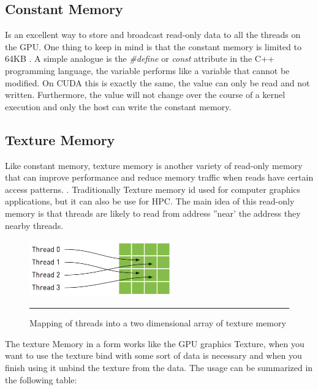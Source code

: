    
\subsection{Constant Memory}

Is an excellent way to store and broadcast read-only data to all the threads on the GPU. One thing to keep in mind is that the constant memory is limited to 64KB \cite{design}. A simple analogue is the \textit{\#define} or \textit{const} attribute in the C++ programming language, the variable performs like a variable that cannot be modified. On CUDA this is exactly the same, the value can only be read and not written. Furthermore, the value will not change over the course of a kernel execution and only the host can write the constant memory\cite{example}.

\subsection{Texture Memory}

Like constant memory, texture memory is another variety of read-only memory that can improve performance and reduce memory traffic when reads have certain access patterns. . Traditionally Texture memory id used for computer graphics applications, but it can also be use for HPC. The main idea of this read-only memory is that threads are likely to read from address ''near' the address they nearby threads.\cite{example}

\begin{figure}[htbp]
	\centering
		\includegraphics[width=0.55\textwidth]{Figures/texture.png}
		\rule{35em}{0.5pt}
	\caption[Texture Memory]{Mapping of threads into a two dimensional array of texture memory}
	\label{fig:texture}
\end{figure}

The texture Memory in a form works like the GPU graphics Texture, when you want to use the texture bind with some sort of data is necessary and when you finish using it unbind the texture from the data. The usage can be summarized in the following table:

